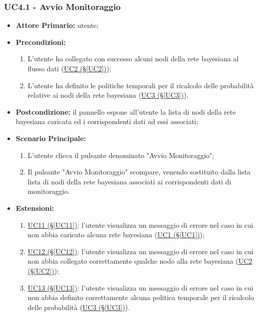 \subsubsection{UC4.1 - Avvio Monitoraggio}\label{UC4.1}
\begin{itemize}
\item \textbf{Attore Primario:} utente;
\item \textbf{Precondizioni:}
	\begin{enumerate}
	\item L'utente ha collegato con successo alcuni nodi della rete bayesiana al flusso dati (\hyperref[UC2]{UC2 					(§\ref*{UC2})});
	\item L'utente ha definito le politiche temporali per il ricalcolo delle probabilità relative ai nodi della rete bayesiana (\hyperref[UC3]{UC3 (§\ref*{UC3})}).
	\end{enumerate}
\item \textbf{Postcondizione:} il pannello espone all'utente la lista di nodi della rete bayesiana caricata ed i corrispondenti dati ad essi associati;
\item \textbf{Scenario Principale:}
	\begin{enumerate}
	\item L'utente clicca il pulsante denominato "Avvio Monitoraggio";
	\item Il pulsante "Avvio Monitoraggio" scompare, venendo sostituito dalla lista lista di nodi della rete 	bayesiana associati ai corrispondenti dati di monitoraggio.
	\end{enumerate}
\item \textbf{Estensioni:}
	\begin{enumerate}
	\item \hyperref[UC11]{UC11 (§\ref*{UC11})}: l'utente visualizza un messaggio di errore nel caso in cui non abbia caricato alcuna rete bayesiana (\hyperref[UC1]{UC1 (§\ref*{UC1})});
	\item \hyperref[UC12]{UC12 (§\ref*{UC12})}: l'utente visualizza un messaggio di errore nel caso in cui non abbia collegato correttamente qualche nodo alla rete bayesiana (\hyperref[UC2]{UC2 (§\ref*{UC2})});
	\item \hyperref[UC13]{UC13 (§\ref*{UC13})}: l'utente visualizza un messaggio di errore nel caso in cui non abbia definito correttamente alcuna politica temporale per il ricalcolo delle probabilità (\hyperref[UC3]{UC3 (§\ref*{UC3})}).
	\end{enumerate}
\end{itemize}

